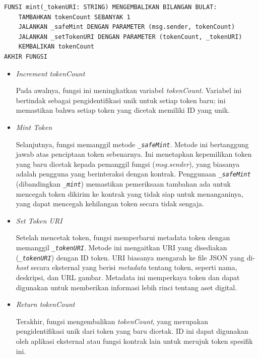 \begin{lstlisting}[caption=Fungsi Mint]
FUNSI mint(_tokenURI: STRING) MENGEMBALIKAN BILANGAN BULAT:
    TAMBAHKAN tokenCount SEBANYAK 1
    JALANKAN _safeMint DENGAN PARAMETER (msg.sender, tokenCount)
    JALANKAN _setTokenURI DENGAN PARAMETER (tokenCount, _tokenURI)
    KEMBALIKAN tokenCount
AKHIR FUNGSI
\end{lstlisting}

\begin{itemize}
    \item \emph{Increment tokenCount}
    
    Pada awalnya, fungsi ini meningkatkan variabel \emph{tokenCount}. Variabel ini bertindak sebagai pengidentifikasi unik untuk setiap token baru; ini memastikan bahwa setiap token yang dicetak memiliki ID yang unik.

    \item \emph{Mint Token}
    
    Selanjutnya, fungsi memanggil metode \emph{\texttt{\_safeMint}}. Metode ini bertanggung jawab atas penciptaan token sebenarnya. Ini menetapkan kepemilikan token yang baru dicetak kepada pemanggil fungsi (\emph{msg.sender}), yang biasanya adalah pengguna yang berinteraksi dengan kontrak. Penggunaan \emph{\texttt{\_safeMint}} (dibandingkan \emph{\texttt{\_mint}}) memastikan pemeriksaan tambahan ada untuk mencegah token dikirim ke kontrak yang tidak siap untuk menanganinya, yang dapat mencegah kehilangan token secara tidak sengaja.

    \item \emph{Set Token URI}
    
    Setelah mencetak token, fungsi memperbarui metadata token dengan memanggil \emph{\texttt{\_tokenURI}}. Metode ini mengaitkan URI yang disediakan (\emph{\texttt{\_tokenURI}}) dengan ID token. URI biasanya mengarah ke file JSON yang di-\emph{host} secara eksternal yang berisi \emph{metadata} tentang token, seperti nama, deskripsi, dan URL gambar. Metadata ini memperkaya token dan dapat digunakan untuk memberikan informasi lebih rinci tentang aset digital.

    \item \emph{Return tokenCount}
    
    Terakhir, fungsi mengembalikan \emph{tokenCount}, yang merupakan pengidentifikasi unik dari token yang baru dicetak. ID ini dapat digunakan oleh aplikasi eksternal atau fungsi kontrak lain untuk merujuk token spesifik ini.
\end{itemize}

